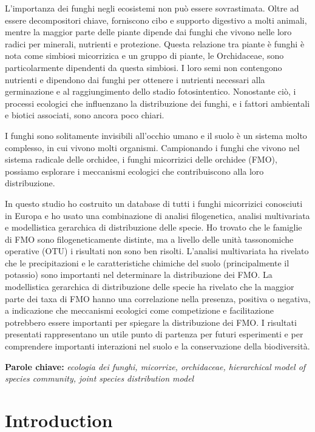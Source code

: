 L'importanza dei funghi negli ecosistemi non può essere sovrastimata. Oltre ad essere decompositori chiave, forniscono cibo e supporto digestivo a molti animali, mentre la maggior parte delle piante dipende dai funghi che vivono nelle loro radici per minerali, nutrienti e protezione. Questa relazione tra piante è funghi è nota come simbiosi micorrizica e un gruppo di piante, le Orchidaceae, sono particolarmente dipendenti da questa simbiosi. I loro semi non contengono nutrienti e dipendono dai funghi per ottenere i nutrienti necessari alla germinazione e al raggiungimento dello stadio fotosintentico. Nonostante ciò, i processi ecologici che influenzano la distribuzione dei funghi, e i fattori ambientali e biotici associati, sono ancora poco chiari.

I funghi sono solitamente invisibili all'occhio umano e il suolo è un sistema molto complesso, in cui vivono molti organismi. Campionando i funghi che vivono nel sistema radicale delle orchidee, i funghi micorrizici delle orchidee (FMO), possiamo esplorare i meccanismi ecologici che contribuiscono alla loro distribuzione.

In questo studio ho costruito un database di tutti i funghi micorrizici conosciuti in Europa e ho usato una combinazione di analisi filogenetica, analisi multivariata e modellistica gerarchica di distribuzione delle specie. Ho trovato che le famiglie di FMO sono filogeneticamente distinte, ma a livello delle unità tassonomiche operative (OTU) i risultati non sono ben risolti. L'analisi multivariata ha rivelato che le precipitazioni e le caratteristiche chimiche del suolo (principalmente il potassio) sono importanti nel determinare la distribuzione dei FMO. La modellistica gerarchica di distribuzione delle specie ha rivelato che la maggior parte dei taxa di FMO hanno una correlazione nella presenza, positiva o negativa, a indicazione che meccanismi ecologici come competizione e facilitazione potrebbero essere importanti per spiegare la distribuzione dei FMO. I risultati presentati rappresentano un utile punto di partenza per futuri esperimenti e per comprendere importanti interazioni nel suolo e la conservazione della biodiversità.

\textbf{Parole chiave:} \emph{ecologia dei funghi, micorrize, orchidaceae, hierarchical model of species community, joint species distribution model}

\part{Introduction}
\label{introduction}

